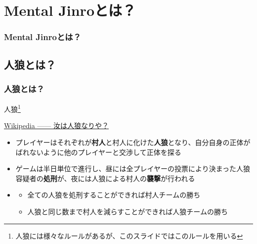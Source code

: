 \section{Mental Jinroとは？}
\begin{frame}[fragile]
  \frametitle{Mental Jinroとは？}
  

  \begin{center}

  \end{center}
\end{frame}

\subsection{人狼とは？}
\begin{frame}[fragile]
  \frametitle{人狼とは？}

  \begin{exampleblock}{人狼\footnote[frame]{人狼には様々なルールがあるが、このスライドではこのルールを用いる}}
    \begin{shadequote}[r]{\scriptsize \href{https://ja.wikipedia.org/wiki/\%E6\%B1\%9D\%E3\%81\%AF\%E4\%BA\%BA\%E7\%8B\%BC\%E3\%81\%AA\%E3\%82\%8A\%E3\%82\%84\%3F}{Wikipedia ------ 汝は人狼なりや？}}
      \begin{itemize}
        \item<2-> プレイヤーはそれぞれが\textbf{村人}と村人に化けた\textbf{人狼}となり、自分自身の正体がばれないように他のプレイヤーと交渉して正体を探る
        \item<3-> ゲームは半日単位で進行し、昼には全プレイヤーの投票により決まった人狼容疑者の\textbf{処刑}が、夜には人狼による村人の\textbf{襲撃}が行われる
        \item
          \begin{itemize}
            \item<4-> 全ての人狼を処刑することができれば村人チームの勝ち
            \item<5-> 人狼と同じ数まで村人を減らすことができれば人狼チームの勝ち
          \end{itemize}
      \end{itemize}
    \end{shadequote}
  \end{exampleblock}
\end{frame}

